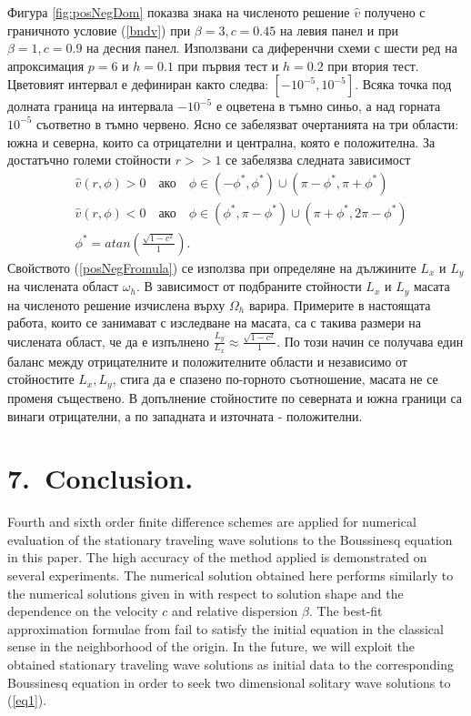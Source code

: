\documentclass[a4paper]{article}
\newcommand{\rf}[1]{(\ref{#1})}
\theoremstyle{remark}
\begin{document}
\FloatBarrier
Фигура \ref{fig:posNegDom} показва знака на численото решение $\widehat v$ получено с граничното условие \rf{bndv} при $\beta=3, c=0.45$ на левия панел и при $\beta=1, c=0.9$ на десния панел. Използвани са диференчни схеми с шести ред на апроксимация $p=6$ и $h=0.1$ при първия тест и $h=0.2$ при втория тест. Цветовият интервал е дефиниран както следва: $[-10^{-5}, 10^{-5}]$. Всяка точка под долната граница на интервала $-10^{-5}$ е оцветена в тъмно синьо, а над горната $10^{-5}$ съответно в тъмно червено. Ясно се забелязват очертанията на три области: южна и северна, които са отрицателни и централна, която е положителна. За достатъчно големи стойности $r >> 1$ се забелязва следната зависимост
\begin{align}\label{posNegFromula}
&\widehat v(r, \phi) > 0 \quad \text{ако} \quad \phi \in (-\phi^*, \phi^*) \cup (\pi - \phi^*, \pi + \phi^*)  \nonumber\\
&\widehat v(r, \phi) < 0 \quad \text{ако} \quad \phi \in (\phi^*, \pi - \phi^*) \cup (\pi + \phi^*, 2\pi-\phi^*) \nonumber\\
&\phi^* = atan(\frac{ \sqrt{1-c^2} }{ 1}).
\end{align}
Свойството \rf{posNegFromula} се използва при определяне на дължините $L_x$ и $L_y$ на числената област $\omega_h$. В зависимост от подбраните стойности $L_x$ и $L_y$ масата на численото решение изчислена върху $\Omega_h$ варира. Примерите в настоящата работа, които се занимават с изследване на масата, са с такива размери на числената област, че да е изпълнено $\frac{L_y}{L_x} \approx \frac{ \sqrt{1-c^2} }{ 1}$. По този начин се получава един баланс между отрицателните и положителните области и независимо от стойностите $L_x, L_y$, стига да е спазено по-горното съотношение, масата не се променя съществено. В допълнение стойностите по северната и южна граници са винаги отрицателни, а по западната и източната -  положителни.
\section{7.~Conclusion.}
Fourth and sixth order finite difference schemes are applied for numerical evaluation of the stationary traveling wave solutions to the Boussinesq equation in this paper. The high accuracy of the method applied is demonstrated on several experiments. The numerical solution obtained here performs similarly to the numerical solutions given in \cite{Ch2012,Ch2011} with respect to solution shape and the dependence on the velocity $c$ and relative dispersion $\beta$. 
The best-fit approximation formulae from \cite{Ch2011} fail to satisfy the initial equation in the classical sense in the neighborhood of the origin. 
In the future, we will exploit the obtained stationary traveling wave solutions as initial data to the corresponding Boussinesq equation in order to seek two dimensional solitary wave solutions to \rf{eq1}.
\end{document}
